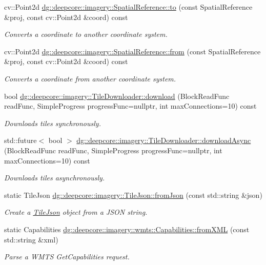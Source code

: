 \begin{DoxyCompactItemize}
cv\+::\+Point2d \hyperlink{group___imagery_module_ga93813925a96518f8253c1cad40192013}{dg\+::deepcore\+::imagery\+::\+Spatial\+Reference\+::to} (const Spatial\+Reference \&proj, const cv\+::\+Point2d \&coord) const 
\begin{DoxyCompactList}\small\item\em Converts a coordinate to another coordinate system. \end{DoxyCompactList}\item 
cv\+::\+Point2d \hyperlink{group___imagery_module_ga40b0fcb6642f08c38ae1f48b1369a631}{dg\+::deepcore\+::imagery\+::\+Spatial\+Reference\+::from} (const Spatial\+Reference \&proj, const cv\+::\+Point2d \&coord) const 
\begin{DoxyCompactList}\small\item\em Converts a coordinate from another coordinate system. \end{DoxyCompactList}\item 
bool \hyperlink{group___imagery_module_gaa827cfb6a45622a0de54b136f7d7b22f}{dg\+::deepcore\+::imagery\+::\+Tile\+Downloader\+::download} (Block\+Read\+Func read\+Func, Simple\+Progress progress\+Func=nullptr, int max\+Connections=10) const 
\begin{DoxyCompactList}\small\item\em Downloads tiles synchronously. \end{DoxyCompactList}\item 
std\+::future$<$ bool $>$ \hyperlink{group___imagery_module_ga8786d795cb77a5853a8f11310a19aa16}{dg\+::deepcore\+::imagery\+::\+Tile\+Downloader\+::download\+Async} (Block\+Read\+Func read\+Func, Simple\+Progress progress\+Func=nullptr, int max\+Connections=10) const 
\begin{DoxyCompactList}\small\item\em Downloads tiles asynchronously. \end{DoxyCompactList}\item 
static Tile\+Json \hyperlink{group___imagery_module_ga00a8cf6ff58f7d1e46ab5d710efe8e79}{dg\+::deepcore\+::imagery\+::\+Tile\+Json\+::from\+Json} (const std\+::string \&json)
\begin{DoxyCompactList}\small\item\em Create a \hyperlink{structdg_1_1deepcore_1_1imagery_1_1_tile_json}{Tile\+Json} object from a J\+S\+ON string. \end{DoxyCompactList}\item 
static Capabilities \hyperlink{group___imagery_module_ga988934c965e1ad4eac2bdc22f8563349}{dg\+::deepcore\+::imagery\+::wmts\+::\+Capabilities\+::from\+X\+ML} (const std\+::string \&xml)
\begin{DoxyCompactList}\small\item\em Parse a W\+M\+TS Get\+Capabilities request. \end{DoxyCompactList}\end{DoxyCompactItemize}
